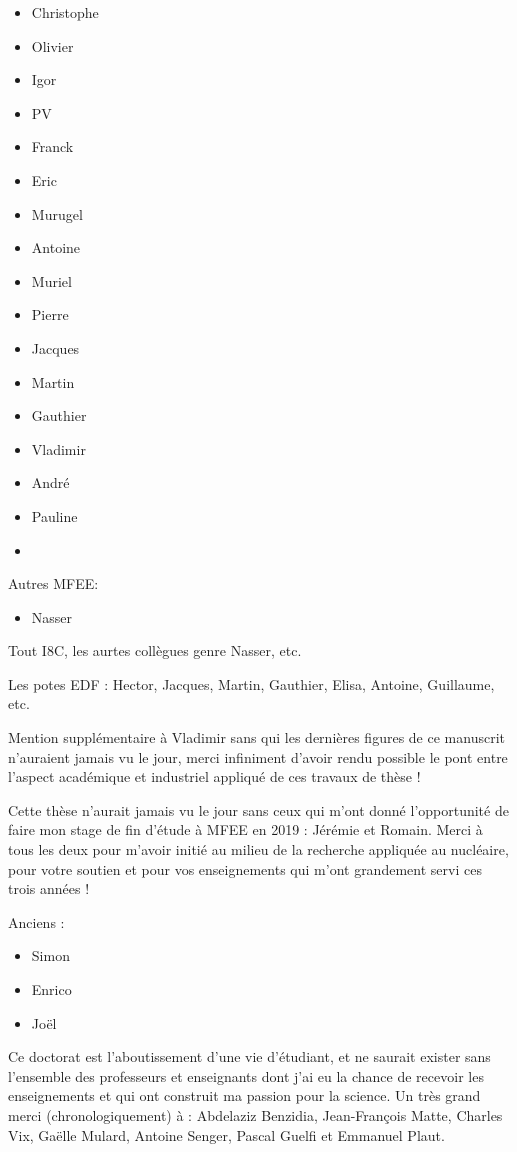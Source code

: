 \begin{itemize}
\item Christophe
\item Olivier
\item Igor
\item PV
\item Franck
\item Eric
\item Murugel
\item Antoine
\item Muriel
\item Pierre
\item Jacques
\item Martin
\item Gauthier
\item Vladimir
\item André
\item Pauline
\item 
\end{itemize}

Autres MFEE:

\begin{itemize}
\item Nasser
\end{itemize}

Tout I8C, les aurtes collègues genre Nasser, etc.

Les potes EDF : Hector, Jacques, Martin, Gauthier, Elisa, Antoine, Guillaume, etc.



Mention supplémentaire à Vladimir sans qui les dernières figures de ce manuscrit n'auraient jamais vu le jour, merci infiniment d'avoir rendu possible le pont entre l'aspect académique et industriel appliqué de ces travaux de thèse !

Cette thèse n'aurait jamais vu le jour sans ceux qui m'ont donné l'opportunité de faire mon stage de fin d'étude à MFEE en 2019 : Jérémie et Romain. Merci à tous les deux pour m'avoir initié au milieu de la recherche appliquée au nucléaire, pour votre soutien et pour vos enseignements qui m'ont grandement servi ces trois années !

Anciens :

\begin{itemize}
\item Simon
\item Enrico
\item Joël
\end{itemize}


Ce doctorat est l'aboutissement d'une vie d'étudiant, et ne saurait exister sans l'ensemble des professeurs et enseignants dont j'ai eu la chance de recevoir les enseignements et qui ont construit ma passion pour la science. Un très grand merci (chronologiquement) à : Abdelaziz Benzidia, Jean-François Matte, Charles Vix, Gaëlle Mulard, Antoine Senger, Pascal Guelfi et Emmanuel Plaut. 

